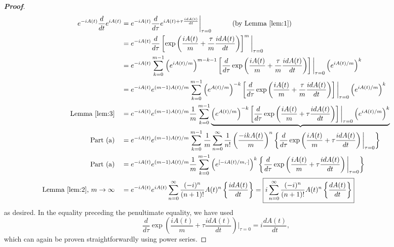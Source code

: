 \documentclass{article}
\theoremstyle{definition}
\newcommand{\f}[2]{\frac{#1}{#2}}
\newcommand{\lp}{\left(}
\newcommand{\rp}{\right)}
\newcommand{\lb}{\left[}
\newcommand{\rb}{\right]}
\newcommand{\lc}{\left\{}
\newcommand{\rc}{\right\}}
\begin{document}
\begin{enumerate}[label=(\alph*)]
	\begin{proof}[\textbf{Proof}]
		\begin{align*}
		e^{-iA(t)} \f{d}{dt} e^{iA(t)} 
		&= e^{-iA(t)}\f{d}{d\tau} e^{iA(t) + \tau \f{idA(t)}{dt}} \bigg\vert_{\tau = 0} \quad\quad\quad (\text{by Lemma \ref{lem:1}})\\
		&= e^{-iA(t)} \f{d}{d\tau} \lb \exp\lp \f{iA(t)}{m} + \f{\tau}{m} \f{idA(t)}{dt} \rp \rb^m \bigg\vert_{\tau = 0}\\
		&= e^{-iA(t)}
		\sum^{m-1}_{k=0}
		\lp e^{iA(t)/m}\rp^{m-k-1}
		\lb \f{d}{d\tau} 
		\exp \lp \f{iA(t)}{m} + \f{\tau}{m}\f{idA(t)}{dt} \rp  
		\rb \bigg\vert_{\tau = 0}
		\lp e^{iA(t)/m} \rp^k\\
		&= e^{-iA(t)}e^{(m-1)A(t)/m} \sum^{m-1}_{k=0} \lp e^{A(t)/m}\rp^{-k}
		\lb \f{d}{d\tau} 
		\exp \lp \f{iA(t)}{m} + \f{\tau}{m}\f{idA(t)}{dt} \rp  
		\rb \bigg\vert_{\tau = 0}
		\lp e^{iA(t)/m} \rp^k
		 \\
		 \text{Lemma \ref{lem:3}}\quad &= e^{-iA(t)}e^{(m-1)A(t)/m} \f{1}{m} \sum^{m-1}_{k=0} \underbrace{\lp e^{A(t)/m}\rp^{-k}
		 \lb \f{d}{d\tau} 
		 \exp \lp \f{iA(t)}{m} + \tau\f{idA(t)}{dt} \rp  
		 \rb \bigg\vert_{\tau = 0}
		 \lp e^{iA(t)/m} \rp^k}\\
		 \text{Part (a)}\quad
		 &= e^{-iA(t)}e^{(m-1)A(t)/m} \sum^{m-1}_{k=0} \f{1}{m} \sum^\infty_{n=0} \f{1}{n!} \lp \f{-ikA(t)}{m} \rp^n \lc  \f{d}{d\tau} 
		 \exp \lp \f{iA(t)}{m} + \tau\f{idA(t)}{dt} \rp  
		 \bigg\vert_{\tau = 0}  \rc\\
		 \text{Part (a)}\quad 
		 &= e^{-iA(t)}e^{(m-1)A(t)/m} \f{1}{m}\sum^{m-1}_{k=0}
		 \lp e^{[-iA(t)/m,\cdot]} \rp^k
		 \lc  \f{d}{d\tau} 
		 \exp \lp \f{iA(t)}{m} + \tau\f{idA(t)}{dt} \rp  
		  \bigg\vert_{\tau = 0}  \rc\\
		 \text{Lemma \ref{lem:2}, } m\to \infty \quad 
		 &= e^{-iA(t)} e^{iA(t)} \sum^\infty_{n=0}\f{(-i)^n}{(n+1)!}A(t)^n \lc \f{idA(t)}{dt} \rc = \boxed{i\sum^\infty_{n=0}\f{(-i)^n}{(n+1)!}A(t)^n \lc \f{dA(t)}{dt} \rc}
		\end{align*}
		as desired. In the equality preceding the penultimate equality, we have used 
		\begin{equation*}
		\f{d}{d\tau} 
		\exp \lp \f{iA(t)}{m} + \tau\f{idA(t)}{dt} \rp  
		\bigg\vert_{\tau = 0} = i\f{dA(t)}{dt},
		\end{equation*}
		which can again be proven straightforwardly using power series.
	\end{proof}
	
\end{enumerate}
	
	
\end{document}
